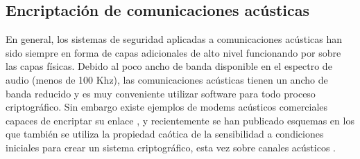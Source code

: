 \subsection{Encriptación de comunicaciones acústicas}

En general, los sistemas de seguridad aplicadas a comunicaciones acústicas han sido siempre en forma de capas adicionales de alto nivel funcionando por sobre las capas físicas. Debido al poco ancho de banda disponible en el espectro de audio (menos de 100 Khz), las comunicaciones acústicas tienen un ancho de banda reducido y es muy conveniente utilizar software para todo proceso criptográfico. Sin embargo existe ejemplos de modems acústicos comerciales capaces de encriptar su enlace \cite{arcelect}, y recientemente se han publicado esquemas en los que también se utiliza la propiedad caótica de la sensibilidad a condiciones iniciales para crear un sistema criptográfico, esta vez sobre canales acústicos \cite{gnanajeyaraman2009audio}.
